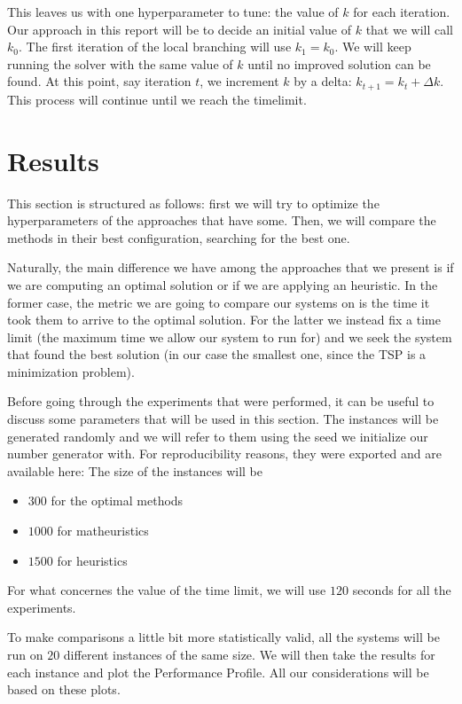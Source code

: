 \documentclass{article}
\begin{document}
This leaves us with one hyperparameter to tune: the value of $k$ for each iteration.
Our approach in this report will be to decide an initial value of $k$ that we will call
$k_{0}$. The first iteration of the local branching will use $k_{1} = k_{0}$.
We will keep running the solver with the same value of $k$ until no improved
solution can be found. At this point, say iteration $t$, we increment $k$ by a delta:
$k_{t+1} = k_{t} + \Delta k$. This process will continue until we reach the timelimit.

\newpage

\section{Results}
\label{sec:results}
This section is structured as follows: first we will try to optimize the hyperparameters
of the approaches that have some. Then, we will compare the methods in their best configuration,
searching for the best one.

Naturally, the main difference we have among the approaches that we present is if we are computing
an optimal solution or if we are applying an heuristic. In the former case, the metric we are going
to compare our systems on is the time it took them to arrive to the optimal solution.
For the latter we instead fix a time limit (the maximum time we allow our system to run for) and
we seek the system that found the best solution (in our case the smallest one, since the TSP
is a minimization problem).

Before going through the experiments that were performed, it can be useful to discuss some
parameters that will be used in this section.
The instances will be generated randomly and we will refer to them using the seed we
initialize our number generator with. For reproducibility reasons, they were exported
and are available here: %
The size of the instances will be
\begin{itemize}
        \item $300$ for the optimal methods
        \item $1000$ for matheuristics
        \item $1500$ for heuristics
\end{itemize}

For what concernes the value of the time limit, we will use $120$ seconds for all the
experiments.

To make comparisons a little bit more statistically valid, all the systems will be run on
$20$ different instances of the same size. We will then take the results for each instance
and plot the Performance Profile. All our considerations will be based on these plots.
\end{document}
